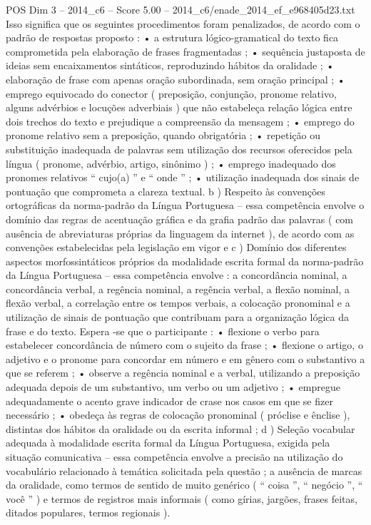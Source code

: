 \begin{textsample}{POS Dim 3 – 2014\_c6 – Score 5.00 – 2014\_c6/enade\_2014\_ef\_e968405d23.txt}
Isso significa que os seguintes procedimentos foram penalizados, de acordo com o padrão de respostas proposto : • a estrutura lógico-gramatical do texto fica comprometida pela elaboração de frases fragmentadas ; • sequência justaposta de ideias sem encaixamentos sintáticos, reproduzindo hábitos da oralidade ; • elaboração de frase com apenas oração subordinada, sem oração principal ; • emprego equivocado do conector ( preposição, conjunção, pronome relativo, alguns advérbios e locuções adverbiais ) que não estabeleça relação lógica entre dois trechos do texto e prejudique a compreensão da mensagem ; • emprego do pronome relativo sem a preposição, quando obrigatória ; • repetição ou substituição inadequada de palavras sem utilização dos recursos oferecidos pela língua ( pronome, advérbio, artigo, sinônimo ) ; • emprego inadequado dos pronomes relativos “ cujo(a) ” e “ onde ” ; • utilização inadequada dos sinais de pontuação que comprometa a clareza textual. b ) Respeito às convenções ortográficas da norma-padrão da Língua Portuguesa – essa competência envolve o domínio das regras de acentuação gráfica e da grafia padrão das palavras ( com ausência de abreviaturas próprias da linguagem da internet ), de acordo com as convenções estabelecidas pela legislação em vigor e c ) Domínio dos diferentes aspectos morfossintáticos próprios da modalidade escrita formal da norma-padrão da Língua Portuguesa – essa competência envolve : a concordância nominal, a concordância verbal, a regência nominal, a regência verbal, a flexão nominal, a flexão verbal, a correlação entre os tempos verbais, a colocação pronominal e a utilização de sinais de pontuação que contribuam para a organização lógica da frase e do texto.
Espera -se que o participante : • flexione o verbo para estabelecer concordância de número com o sujeito da frase ; • flexione o artigo, o adjetivo e o pronome para concordar em número e em gênero com o substantivo a que se referem ; • observe a regência nominal e a verbal, utilizando a preposição adequada depois de um substantivo, um verbo ou um adjetivo ; • empregue adequadamente o acento grave indicador de crase nos casos em que se fizer necessário ; • obedeça às regras de colocação pronominal ( próclise e ênclise ), distintas dos hábitos da oralidade ou da escrita informal ; d ) Seleção vocabular adequada à modalidade escrita formal da Língua Portuguesa, exigida pela situação comunicativa – essa competência envolve a precisão na utilização do vocabulário relacionado à temática solicitada pela questão ; a ausência de marcas da oralidade, como termos de sentido de muito genérico ( “ coisa ”, “ negócio ”, “ você ” ) e termos de registros mais informais ( como gírias, jargões, frases feitas, ditados populares, termos regionais ).

\end{textsample}
